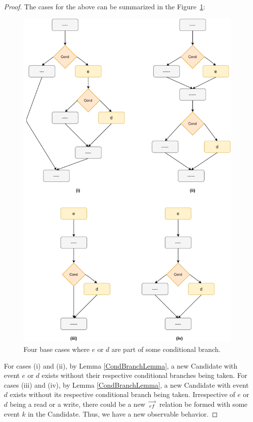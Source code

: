 \begin{proof}
            The cases for the above can be summarized in the Figure~\ref{reord:cond_branch_cases}: 
            \begin{figure}[H]
                \label{CondCases}
                \centering 
                \includegraphics[scale=0.6]{4.InstructionReordering/5.ValidReorderingProgram/ConditionalCases.pdf}
                \caption{Four base cases where $e$ or $d$ are part of some conditional branch.}
                \label{reord:cond_branch_cases}
            \end{figure}

            For cases (i) and (ii), by Lemma \ref{CondBranchLemma}, a new Candidate with event $e$ or $d$ exists without their respective conditional branches being taken.
            For cases (iii) and (iv), by Lemma \ref{CondBranchLemma}, a new Candidate with event $d$ exists without its respective conditional branch being taken.
            Irrespective of $e$ or $d$ being a read or a write, there could be a new $\stackrel{\longrightarrow}{_{rf}}$ relation be formed with some event $k$ in the Candidate. Thus, we have a new observable behavior\footnotemark. 


\end{proof}
